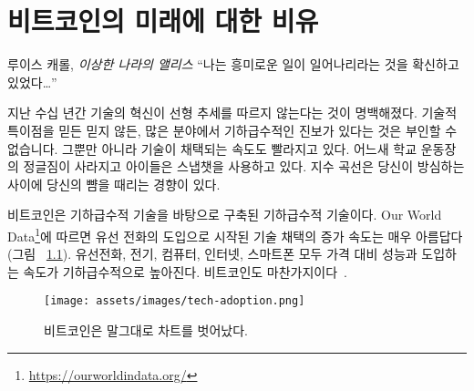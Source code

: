 \chapter{비트코인의 미래에 대한 비유}
\label{les:21}

\begin{chapquote}{루이스 캐롤, \textit{이상한 나라의 앨리스}}
	\enquote{나는 흥미로운 일이 일어나리라는 것을 확신하고 있었다\ldots}
\end{chapquote}

\begin{comment}
	In the last couple of decades, it became ap유hether you believe in the
	technological singularity or not, it is undeniable that progress is
	exponential in many fields. Not only that, but the rate at which
	technologies are being adopted is accelerating, and before you know it
	the bush in the local schoolyard is gone and your kids are using
	Snapchat instead. Exponential curves have the tendency to slap you in
	the face way before you see them coming.
\end{comment}
지난 수십 년간 기술의 혁신이 선형 추세를 따르지 않는다는 것이 명백해졌다.
기술적 특이점을 믿든 믿지 않든, 많은 분야에서 기하급수적인 진보가 있다는 것은 부인할 수 없습니다.
그뿐만 아니라 기술이 채택되는 속도도 빨라지고 있다. 
어느새 학교 운동장의 정글짐이 사라지고 아이들은 스냅챗을 사용하고 있다.
지수 곡선은 당신이 방심하는 사이에 당신의 뺨을 때리는 경향이 있다.

\begin{comment}
	Bitcoin is an exponential technology built upon exponential technologies.
	\textit{Our World in Data}\footnote{\url{https://ourworldindata.org/}}
	beautifully shows the rising speed of technological adoption, starting in 1903
	with the introduction of landlines (see Figure~\ref{fig:tech-adoption}).
	Landlines, electricity, computers, the internet, smartphones; all follow
	exponential trends in price-performance and adoption. Bitcoin does
	too~\cite{tech-adoption}.
\end{comment}
비트코인은 기하급수적 기술을 바탕으로 구축된 기하급수적 기술이다.
Our World Data\footnote{\url{https://ourworldindata.org/}}에 따르면 유선 전화의 도입으로 시작된
기술 채택의 증가 속도는 매우 아름답다(그림 ~\ref{fig:tech-adoption}).
유선전화, 전기, 컴퓨터, 인터넷, 스마트폰 모두 가격 대비 성능과 도입하는 속도가 기하급수적으로 높아진다.
비트코인도 마찬가지이다~\cite{tech-adoption}.

\begin{figure}
	\texttt{[image: assets/images/tech-adoption.png]}
	\caption{비트코인은 말그대로 차트를 벗어났다.}
	\label{fig:tech-adoption}
\end{figure}

